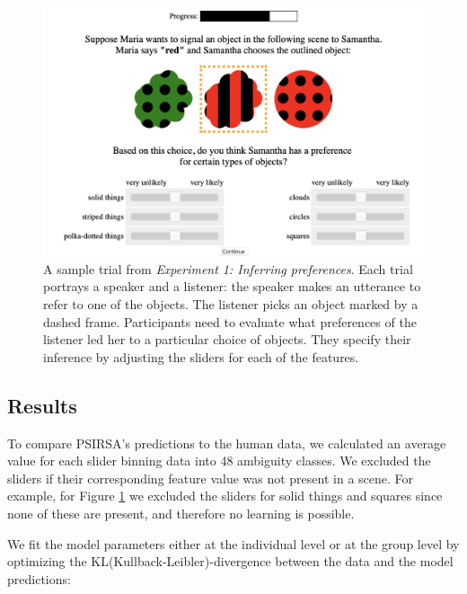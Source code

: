 \documentclass[10pt,a4paper]{article}
\newcommand{\gcs}[1]{\textcolor{blue}{[gcs: #1]}}
\begin{document}
\begin{figure}[ht!]
	\centering
	\includegraphics[width=4.5in]{images/preference-trial.png}
	\caption{ \small{A sample trial from \emph{Experiment 1: Inferring preferences}. Each trial portrays a speaker and a listener: the speaker makes an utterance to refer to one of the objects. The listener picks an object marked by a dashed frame. Participants need to evaluate what preferences of the listener led her to a particular choice of objects. They specify their inference by adjusting the sliders for each of the features}.}\label{exp1-trial}
\end{figure}

\subsection{Results}

To compare PSIRSA's predictions to the human data, we calculated an average value for each slider binning data into 48 ambiguity classes. We excluded the sliders if their corresponding feature value was not present in a scene. For example, for Figure \ref{exp1-trial} we excluded the sliders for solid things and squares since none of these are present, and therefore no learning is possible.

We fit the model parameters either at the individual level or at the group level by optimizing the KL(Kullback-Leibler)-divergence between the data and the model predictions:
\end{document}
